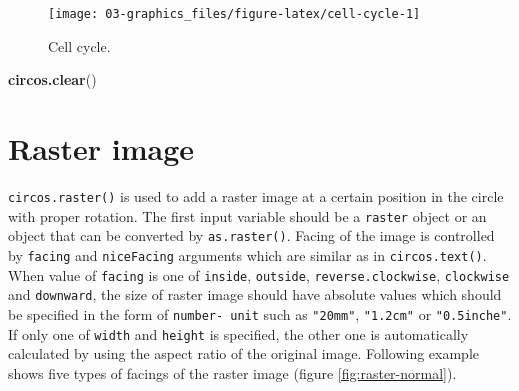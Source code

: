 \documentclass[]{book}
\newenvironment{Shaded}{\begin{snugshade}}{\end{snugshade}}
\newcommand{\KeywordTok}[1]{\textcolor[rgb]{0.13,0.29,0.53}{\textbf{#1}}}
\newcommand{\NormalTok}[1]{#1}
\begin{document}
\begin{figure}

{\centering \texttt{[image: 03-graphics\_files/figure-latex/cell-cycle-1]} 

}

\caption{Cell cycle.}\label{fig:cell-cycle}
\end{figure}

\begin{Shaded}
\begin{Highlighting}[]
\KeywordTok{circos.clear}\NormalTok{()}
\end{Highlighting}
\end{Shaded}

\section{Raster image}\label{raster-image}

\texttt{circos.raster()} is used to add a raster image at a certain
position in the circle with proper rotation. The first input variable
should be a \texttt{raster} object or an object that can be converted by
\texttt{as.raster()}. Facing of the image is controlled by
\texttt{facing} and \texttt{niceFacing} arguments which are similar as
in \texttt{circos.text()}. When value of \texttt{facing} is one of
\texttt{inside}, \texttt{outside}, \texttt{reverse.clockwise},
\texttt{clockwise} and \texttt{downward}, the size of raster image
should have absolute values which should be specified in the form of
\texttt{number-\ unit} such as \texttt{"20mm"}, \texttt{"1.2cm"} or
\texttt{"0.5inche"}. If only one of \texttt{width} and \texttt{height}
is specified, the other one is automatically calculated by using the
aspect ratio of the original image. Following example shows five types
of facings of the raster image (figure \ref{fig:raster-normal}).
\end{document}
